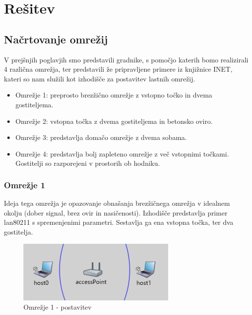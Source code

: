 \documentclass[11pt,a4paper,slovene]{myarticle}
\begin{document}
\pagebreak

\section{Rešitev}

\subsection{Načrtovanje omrežij}
V prejšnjih poglavjih smo predstavili gradnike, s pomočjo katerih bomo realizirali 4 različna omrežja, ter predstavili že pripravljene primere iz knjižnice INET, kateri so nam služili kot izhodišče za postavitev lastnih omrežij.
\begin{itemize}
	\item Omrežje 1: preprosto brezžično omrežje z vstopno točko in dvema gostiteljema.
	\item Omrežje 2: vstopna točka z dvema gostiteljema in betonsko oviro.
	\item Omrežje 3: predstavlja domačo omrežje z dvema sobama.
	\item Omrežje 4: predstavlja bolj zapleteno omrežje z več vstopnimi točkami. Gostitelji so razporejeni v prostorih ob hodniku.
\end{itemize}

\pagebreak

\subsubsection{Omrežje 1}
Ideja tega omrežja je opazovanje obnašanja brezžičnega omrežja v idealnem okolju (dober signal, brez ovir in nasičenosti). Izhodišče predstavlja primer lan80211 s spremenjenimi parametri. Sestavlja ga ena vstopna točka, ter dva gostitelja.
\begin{figure}[h!]
	\centering
		\includegraphics[width=0.7\textwidth, keepaspectratio=true]{./images/om1-layout.png}
	\caption{Omrežje 1 - postavitev}
	\label{fig:om1layout}
\end{figure}
\end{document}

